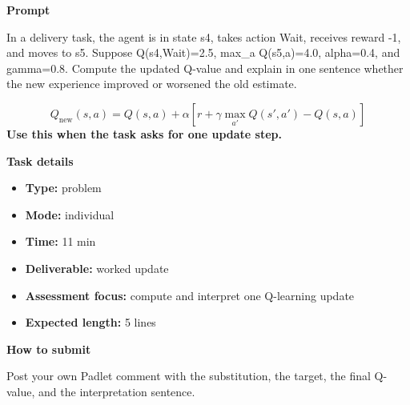 \documentclass[11pt]{article}
\begin{document}
\begin{tcolorbox}[colback=white,colframe=MidnightBlue,title={Q2 RL Update and Interpretation},fonttitle=\bfseries,breakable]
\begin{center}
\end{center}

{\large\bfseries\color{MidnightBlue} Prompt}\par\medskip
In a delivery task, the agent is in state s4, takes action Wait, receives reward -1, and moves to s5. Suppose Q(s4,Wait)=2.5, max\_a Q(s5,a)=4.0, alpha=0.4, and gamma=0.8. Compute the updated Q-value and explain in one sentence whether the new experience improved or worsened the old estimate.

\begin{tcolorbox}[colback=ForestGreen!5,colframe=ForestGreen,title={Formula reminder},fonttitle=\bfseries,breakable]
\[
Q_{\text{new}}(s,a)=Q(s,a)+\alpha\left[r+\gamma \max_{a'}Q(s',a')-Q(s,a)\right]
\]
\textbf{Use this when the task asks for one update step.}
\end{tcolorbox}

{\large\bfseries\color{MidnightBlue} Task details}\par\medskip
\begin{itemize}\item \textbf{Type:} problem
\item \textbf{Mode:} individual
\item \textbf{Time:} 11 min
\item \textbf{Deliverable:} worked update
\item \textbf{Assessment focus:} compute and interpret one Q-learning update
\item \textbf{Expected length:} 5 lines\end{itemize}

{\large\bfseries\color{MidnightBlue} How to submit}\par\medskip
Post your own Padlet comment with the substitution, the target, the final Q-value, and the interpretation sentence.


\end{tcolorbox}
\end{document}

